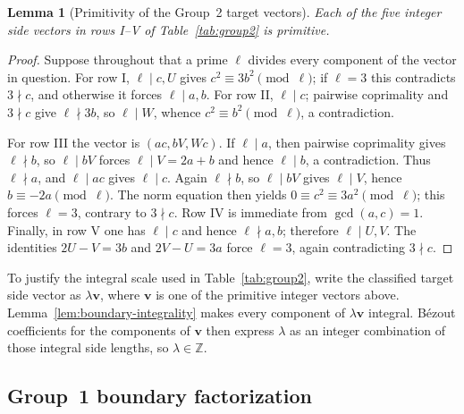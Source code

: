 \documentclass[11pt]{amsart}
\newtheorem{lemma}[theorem]{Lemma}
\theoremstyle{definition}
\theoremstyle{remark}
\newcommand{\Z}{\mathbb Z}
\begin{document}
\begin{lemma}[Primitivity of the Group~2 target vectors]
\label{lem:target-primitivity}
Each of the five integer side vectors in rows I--V of
Table~\ref{tab:group2} is primitive.
\end{lemma}

\begin{proof}
Suppose throughout that a prime $\ell$ divides every component of the vector
in question.  For row I, $\ell\mid c,U$ gives
$c^2\equiv3b^2\pmod\ell$; if $\ell=3$ this contradicts $3\nmid c$, and
otherwise it forces $\ell\mid a,b$.  For row II, $\ell\mid c$; pairwise
coprimality and $3\nmid c$ give $\ell\nmid3b$, so $\ell\mid W$, whence
$c^2\equiv b^2\pmod\ell$, a contradiction.

For row III the vector is $(ac,bV,Wc)$.  If $\ell\mid a$, then
pairwise coprimality gives $\ell\nmid b$, so $\ell\mid bV$ forces
$\ell\mid V=2a+b$ and hence $\ell\mid b$, a contradiction.  Thus
$\ell\nmid a$, and $\ell\mid ac$ gives $\ell\mid c$.  Again
$\ell\nmid b$, so $\ell\mid bV$ gives $\ell\mid V$, hence
$b\equiv-2a\pmod\ell$.  The norm equation then yields
$0\equiv c^2\equiv3a^2\pmod\ell$; this forces $\ell=3$, contrary to
$3\nmid c$.
Row IV is immediate from $\gcd(a,c)=1$.  Finally, in row V one has
$\ell\mid c$ and hence $\ell\nmid a,b$; therefore $\ell\mid U,V$.
The identities $2U-V=3b$ and $2V-U=3a$ force $\ell=3$, again contradicting
$3\nmid c$.
\end{proof}

To justify the integral scale used in Table~\ref{tab:group2}, write the
classified target side vector as $\lambda\mathbf v$, where $\mathbf v$ is
one of the primitive integer vectors above.  Lemma~\ref{lem:boundary-integrality}
makes every component of $\lambda\mathbf v$ integral.  B\'ezout coefficients
for the components of $\mathbf v$ then express $\lambda$ as an integer
combination of those integral side lengths, so $\lambda\in\Z$.

\subsection{Group~1 boundary factorization}
\end{document}

